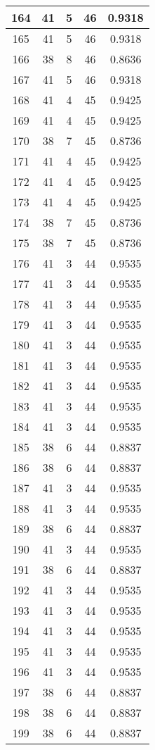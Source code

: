 \documentclass[letterpaper, 12pt]{article}
\begin{document}
\begin{longtable}{|c|c|c|c|c|}
\hline
164 & 41 & 5 & 46 & 0.9318 \\
\hline
165 & 41 & 5 & 46 & 0.9318 \\
\hline
166 & 38 & 8 & 46 & 0.8636 \\
\hline
167 & 41 & 5 & 46 & 0.9318 \\
\hline
168 & 41 & 4 & 45 & 0.9425 \\
\hline
169 & 41 & 4 & 45 & 0.9425 \\
\hline
170 & 38 & 7 & 45 & 0.8736 \\
\hline
171 & 41 & 4 & 45 & 0.9425 \\
\hline
172 & 41 & 4 & 45 & 0.9425 \\
\hline
173 & 41 & 4 & 45 & 0.9425 \\
\hline
174 & 38 & 7 & 45 & 0.8736 \\
\hline
175 & 38 & 7 & 45 & 0.8736 \\
\hline
176 & 41 & 3 & 44 & 0.9535 \\
\hline
177 & 41 & 3 & 44 & 0.9535 \\
\hline
178 & 41 & 3 & 44 & 0.9535 \\
\hline
179 & 41 & 3 & 44 & 0.9535 \\
\hline
180 & 41 & 3 & 44 & 0.9535 \\
\hline
181 & 41 & 3 & 44 & 0.9535 \\
\hline
182 & 41 & 3 & 44 & 0.9535 \\
\hline
183 & 41 & 3 & 44 & 0.9535 \\
\hline
184 & 41 & 3 & 44 & 0.9535 \\
\hline
185 & 38 & 6 & 44 & 0.8837 \\
\hline
186 & 38 & 6 & 44 & 0.8837 \\
\hline
187 & 41 & 3 & 44 & 0.9535 \\
\hline
188 & 41 & 3 & 44 & 0.9535 \\
\hline
189 & 38 & 6 & 44 & 0.8837 \\
\hline
190 & 41 & 3 & 44 & 0.9535 \\
\hline
191 & 38 & 6 & 44 & 0.8837 \\
\hline
192 & 41 & 3 & 44 & 0.9535 \\
\hline
193 & 41 & 3 & 44 & 0.9535 \\
\hline
194 & 41 & 3 & 44 & 0.9535 \\
\hline
195 & 41 & 3 & 44 & 0.9535 \\
\hline
196 & 41 & 3 & 44 & 0.9535 \\
\hline
197 & 38 & 6 & 44 & 0.8837 \\
\hline
198 & 38 & 6 & 44 & 0.8837 \\
\hline
199 & 38 & 6 & 44 & 0.8837 \\
\hline
\end{longtable}
\end{document}
